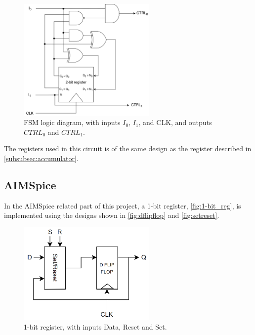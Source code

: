 \begin{figure}[H]
    \centering
    \includegraphics[width=0.6\textwidth]{Figures/logic diagram.png}
    \caption{FSM logic diagram, with inputs $I_0$, $I_1$, and CLK, and outputs $CTRL_0$ and $CTRL_1$.}
    \label{fig:fsm_logic_diagram}
\end{figure}

\noindent
The registers used in this circuit is of the same design as the register described in \autoref{subsubsec:accumulator}.

\subsection{AIMSpice}
\label{subsec:aimspicemethod}

In the AIMSpice related part of this project, a 1-bit register, \autoref{fig:1-bit_reg}, is implemented using the designs shown in \autoref{fig:dflipflop} and \ref{fig:setreset}.

\begin{figure}[H]
    \centering
    \includegraphics[width=0.6\textwidth]{Figures/1-bit register.png}
    \caption{1-bit register, with inputs Data, Reset and Set.}
    \label{fig:1-bit_reg}
\end{figure}

